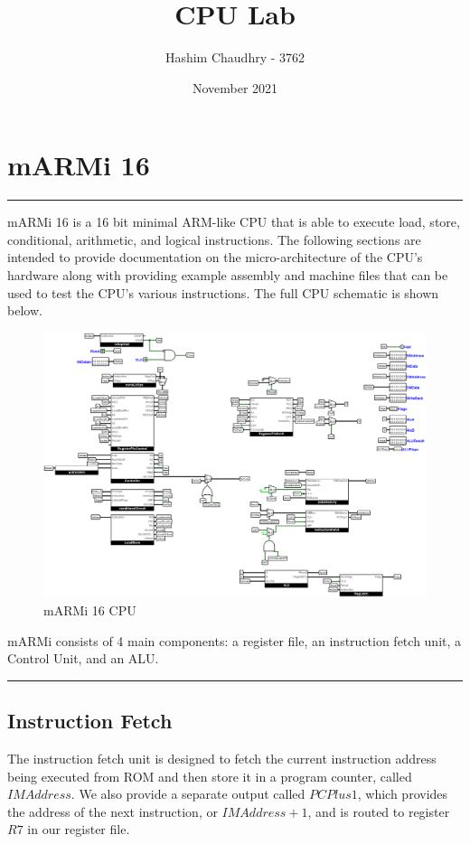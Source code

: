 \documentclass[12pt, letter]{article}
\title{CPU Lab}
\author{Hashim Chaudhry - 3762}
\date{November 2021}
\begin{document}
	\begin{titlepage}
		\maketitle
		\thispagestyle{empty}
	\end{titlepage}
	
	\raggedright
	
	\section{mARMi 16}
	\hrule
	\bigskip
	
	mARMi 16 is a 16 bit minimal ARM-like CPU that is able to execute load, store, conditional, arithmetic, and logical instructions. The following sections are intended to provide documentation on the micro-architecture of the CPU's hardware along with providing example assembly and machine files that can be used to test the CPU's various instructions. The full CPU schematic is shown below.
	\bigskip
	
	\begin{figure}[h]
		\centering
		\includegraphics[scale = 0.25]{CPU}
		\caption{mARMi 16 CPU}
		\label{fig:CPU}
	\end{figure}

	mARMi consists of 4 main components: a register file, an instruction fetch unit, a Control Unit, and an ALU. 
	\bigskip

	\hrule
	\newpage
	
	\subsection{Instruction Fetch}
	The instruction fetch unit is designed to fetch the current instruction address being executed from ROM and then store it in a program counter, called $IMAddress$. We also provide a separate output called $PCPlus1$, which provides the address of the next instruction, or $IMAddress + 1$, and is routed to register $R7$ in our register file. 
	
\end{document}
